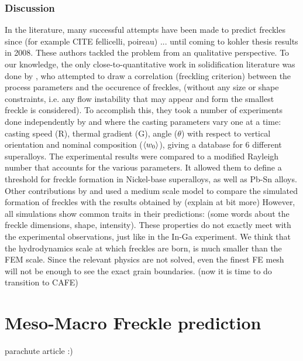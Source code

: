 \subsubsection{Discussion}
In the literature, many successful attempts have been made to predict freckles since (for example CITE fellicelli, poireau) ... until coming to kohler thesis results in 2008. These authors tackled the problem from an qualitative perspective. To our knowledge, the only close-to-quantitative work in solidification literature was done by \citet{ramirez_evaluation_2003}, who attempted to draw a correlation (freckling criterion) between the process parameters and the occurence of freckles, (without any size or shape constraints, i.e. any flow instability that may appear and form the smallest freckle is considered). To accomplish this, they took a number of experiments done independently by \citet{pollock_breakdown_1996} and \citet{auburtin_freckle_2000} where the casting parameters vary one at a time: casting speed (R), thermal gradient (G), angle ($\theta$) with respect to vertical orientation and nominal composition ($\langle w_0 \rangle$), giving a database for 6 different superalloys. The experimental results were compared to a modified Rayleigh number that accounts for the various parameters. It allowed them to define a threshold for freckle formation in Nickel-base superalloys, as well as Pb-Sn alloys.
Other contributions by \citet{yuan_new_2012} and  \citet{karagadde_3-d_2014} used a medium scale model to compare the simulated formation of freckles with the results obtained by \citet{shevchenko_chimney_2013} (explain at bit more)
However, all simulations show common traits in their predictions: (some words about the freckle dimensions, shape, intensity). These properties do not exactly meet with the experimental observations, just like in the In-Ga experiment. We think that the hydrodynamics scale 
at which freckles are born, is much smaller than the FEM scale. Since the relevant physics are not solved, even the finest FE mesh will not
be enough to see the exact grain boundaries. (now it is time to do transition to CAFE)



\section{Meso-Macro Freckle prediction}

parachute article :)
















